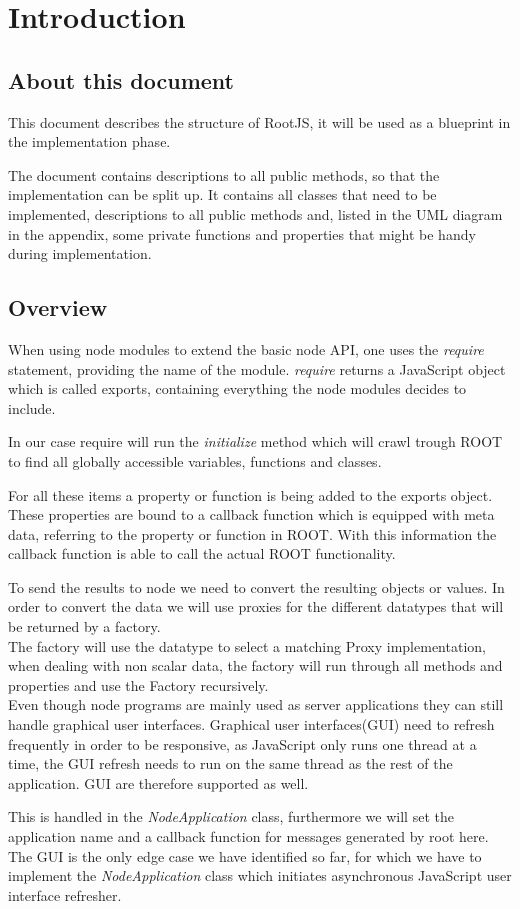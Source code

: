 \chapter{Introduction}
\section{About this document}
This document describes the structure of RootJS, it will be used as a blueprint in the implementation phase.

The document contains descriptions to all public methods, so that the implementation can be split up. It contains all classes that need to be implemented, descriptions to all public methods and, listed in the UML diagram in the appendix, some private functions and properties that might be handy during implementation.

\section{Overview}
When using node modules to extend the basic node API, one uses the \textit{require} statement, providing the name of the module.
\textit{require} returns a JavaScript object which is called exports, containing everything the node modules decides to include.

In our case require will run the \textit{initialize} method which will crawl trough ROOT to find all globally accessible variables, functions and classes.

For all these items a property or function is being added to the exports object.
These properties are bound to a callback function which is equipped with meta data, referring to the property or function in ROOT.
With this information the callback function is able to call the actual ROOT functionality.

To send the results to node we need to convert the resulting objects or values.
In order to convert the data we will use proxies for the different datatypes that will be returned by a factory.\\

The factory will use the datatype to select a matching Proxy implementation, when dealing with non scalar data, the factory will run through all methods and properties and use the Factory recursively.\\

Even though node programs are mainly used as server applications they can still handle graphical user interfaces.
Graphical user interfaces(GUI) need to refresh frequently in order to be responsive, as JavaScript only runs one thread at a time, the GUI refresh needs to run on the same thread as the rest of the application. GUI are therefore supported as well. 

This is handled in the \textit{NodeApplication} class, furthermore we will set the application name and a callback function for messages generated by root here. The GUI is the only edge case we have identified so far, for which we have to implement the \textit{NodeApplication} class which initiates asynchronous JavaScript user interface refresher. 
